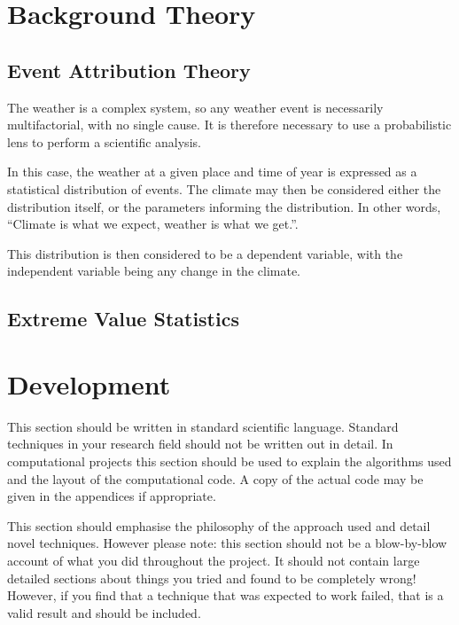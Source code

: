\documentclass[12pt,a4paper]{report}
\begin{document}
\chapter{Background Theory}\label{ch:background}

\section{Event Attribution Theory}\label{sec:attribution}

The weather is a complex system,
    so any weather event is necessarily multifactorial,
    with no single cause.
It is therefore necessary to use a probabilistic lens to perform a scientific analysis.

In this case, the weather at a given place and time of year is expressed as a statistical distribution of events.
The climate may then be considered either the distribution itself,
    or the parameters informing the distribution.
In other words, ``Climate is what we expect, weather is what we get.''.

This distribution is then considered to be a dependent variable,
    with the independent variable being any change in the climate.

\section{Extreme Value Statistics}\label{sec:exstats}

\chapter{Development}\label{ch:dev}


This section should be written in standard scientific
language. Standard techniques in your research field should not be
written out in detail. In computational projects this section should
be used to explain the algorithms used and the layout of the
computational code. A copy of the actual code may be given in the
appendices if appropriate.

This section should emphasise the philosophy of the approach used and
detail novel techniques. However please note: this section should not
be a blow-by-blow account of what you did throughout the project. It
should not contain large detailed sections about things you tried and
found to be completely wrong! However, if you find that a technique
that was expected to work failed, that is a valid result and should be
included.
\end{document}
